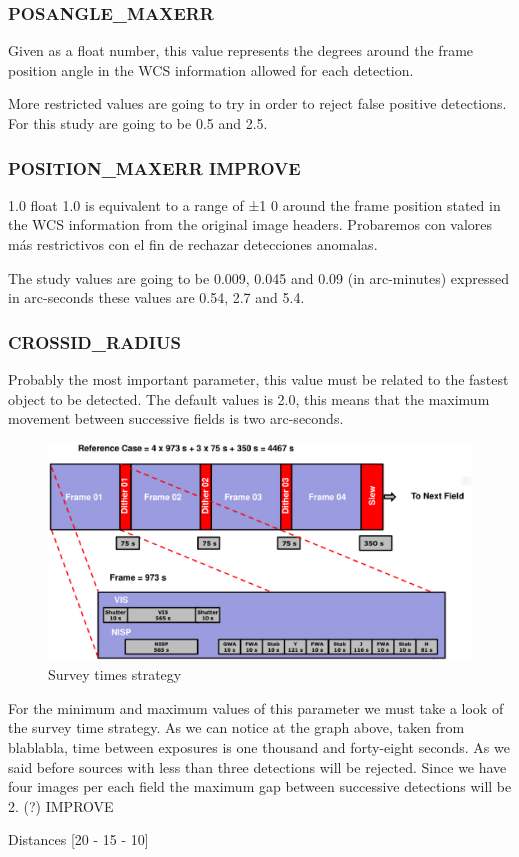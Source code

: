 \documentclass{article}
\begin{document}
\subsubsection{POSANGLE\_MAXERR}
Given as a float number, this value represents the degrees around the frame position angle in the WCS information allowed for each detection. 
\par More restricted values are going to try in order to reject false positive detections. For this study are going to be 0.5 and 2.5.

\subsubsection{POSITION\_MAXERR IMPROVE}
1.0 float
 1.0 is
equivalent to a range of ±1 0 around the frame position stated in the WCS information
from the original image headers.
Probaremos con valores más restrictivos con el fin de rechazar detecciones anomalas.
\par The study values are going to be 0.009, 0.045 and 0.09 (in arc-minutes) expressed in arc-seconds these values are 0.54, 2.7 and 5.4. 

\subsubsection{CROSSID\_RADIUS}
Probably the most important parameter, this value must be related to the fastest object to be detected. The default values is 2.0, this means that the maximum movement between successive fields is two arc-seconds.

\begin{figure}[H]
\centering
\includegraphics[width=.9\linewidth]{images/survey_times.eps}
\caption{Survey times strategy}
\end{figure}

\par For the minimum and maximum values of this parameter we must take a look of the survey time strategy. As we can notice at the graph above, taken from blablabla, time between exposures is one thousand and forty-eight seconds. As we said before sources with less than three detections will be rejected. Since we have four images per each field the maximum gap between successive detections will be 2. (?) IMPROVE
\par Distances [20 - 15 - 10]
\end{document}
